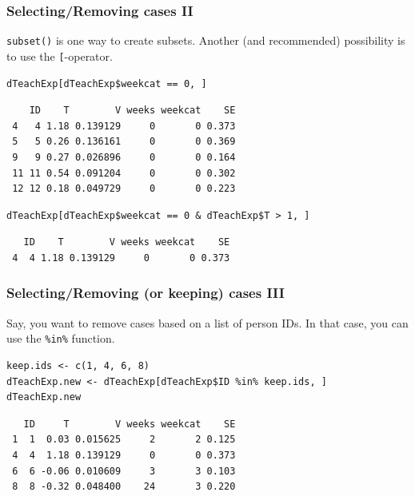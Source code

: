 \documentclass[bigger]{beamer}
\begin{document}
\begin{frame}[fragile,shrink=10]
\frametitle{Selecting/Removing cases II}
\label{sec-4-1-4}

    \texttt{subset()} is one way to create subsets. Another (and recommended)
    possibility is to use the \texttt{[}-operator. 

\lstset{language=R}
\begin{lstlisting}
dTeachExp[dTeachExp$weekcat == 0, ]
\end{lstlisting}

\begin{verbatim}
    ID    T        V weeks weekcat    SE
 4   4 1.18 0.139129     0       0 0.373
 5   5 0.26 0.136161     0       0 0.369
 9   9 0.27 0.026896     0       0 0.164
 11 11 0.54 0.091204     0       0 0.302
 12 12 0.18 0.049729     0       0 0.223
\end{verbatim}



\lstset{language=R}
\begin{lstlisting}
dTeachExp[dTeachExp$weekcat == 0 & dTeachExp$T > 1, ]
\end{lstlisting}

\begin{verbatim}
   ID    T        V weeks weekcat    SE
 4  4 1.18 0.139129     0       0 0.373
\end{verbatim}
\end{frame}
\begin{frame}[fragile,shrink=10]
\frametitle{Selecting/Removing (or keeping) cases III}
\label{sec-4-1-5}

    Say, you want to remove cases based on a list of person IDs. In that case, you can use the \texttt{\%in\%} function.

\lstset{language=R}
\begin{lstlisting}
keep.ids <- c(1, 4, 6, 8)
dTeachExp.new <- dTeachExp[dTeachExp$ID %in% keep.ids, ]
dTeachExp.new
\end{lstlisting}

\begin{verbatim}
   ID     T        V weeks weekcat    SE
 1  1  0.03 0.015625     2       2 0.125
 4  4  1.18 0.139129     0       0 0.373
 6  6 -0.06 0.010609     3       3 0.103
 8  8 -0.32 0.048400    24       3 0.220
\end{verbatim}

    
    
    
\end{frame}
\end{document}
